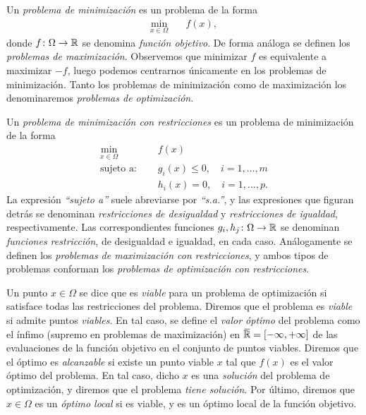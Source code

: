 \begin{definition}
    Un \emph{problema de minimización} es un problema de la forma
    \begin{align*}
        \min_{x \in \Omega} &\quad f(x),
    \end{align*}
    donde $f\colon \Omega \to \mathbb{R}$ se denomina \emph{función objetivo}. De forma análoga se definen los \emph{problemas de maximización}. Observemos que minimizar $f$ es equivalente a maximizar $-f$, luego podemos centrarnos únicamente en los problemas de minimización. Tanto los problemas de minimización como de maximización los denominaremos \emph{problemas de optimización}.

    Un \emph{problema de minimización con restricciones} es un problema de minimización de la forma
    \begin{align*}
        \min_{x \in \Omega} &\quad f(x)  \\
        \text{sujeto a: } &\quad g_i(x) \le 0, \quad i=1,\dots,m \\
                          &\quad h_i(x) = 0, \quad i=1,\dots,p.
    \end{align*}
    La expresión \emph{``sujeto a''} suele abreviarse por \emph{``s.a.''}, y las expresiones que figuran detrás se denominan \emph{restricciones de desigualdad} y \emph{restricciones de igualdad}, respectivamente. Las correspondientes funciones $g_i,h_j \colon \Omega \to \mathbb{R}$ se denominan \emph{funciones restricción}, de desigualdad e igualdad, en cada caso. Análogamente se definen los \emph{problemas de maximización con restricciones}, y ambos tipos de problemas conforman los \emph{problemas de optimización con restricciones}.

    Un punto $x \in \Omega$ se dice que es \emph{viable} para un problema de optimización si satisface todas las restricciones del problema. Diremos que el problema es \emph{viable} si admite puntos \emph{viables}. En tal caso, se define el \emph{valor óptimo} del problema como el ínfimo (supremo en problemas de maximización) en $\closure{\R} = [-\infty,+\infty]$ de las evaluaciones de la función objetivo en el conjunto de puntos viables. Diremos que el óptimo es \emph{alcanzable} si existe un punto viable $x$ tal que $f(x)$ es el valor óptimo del problema. En tal caso, dicho $x$ es una \emph{solución} del problema de optimización, y diremos que el problema \emph{tiene solución}. Por último, diremos que $x \in \Omega$ es un \emph{óptimo local} si es viable, y es un óptimo local de la función objetivo.


\end{definition}
